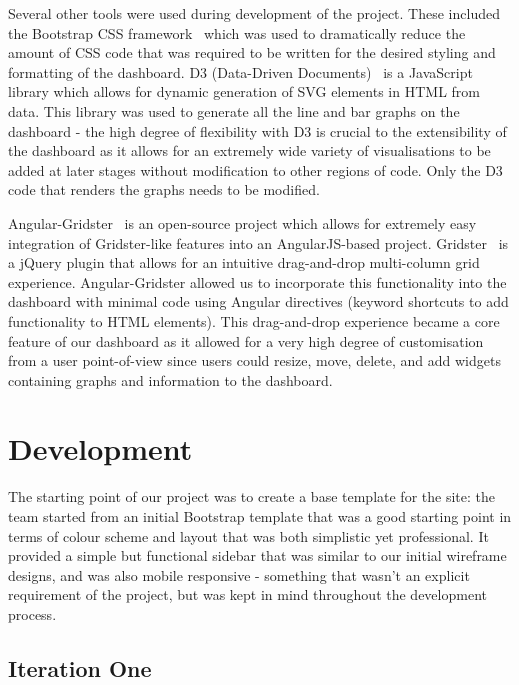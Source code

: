 \documentclass{l3proj}
\begin{document}
Several other tools were used during development of the project. These included the Bootstrap CSS framework~\cite{Bootstrap} which was used to dramatically reduce the amount of CSS code that was required to be written for the desired styling and formatting of the dashboard. D3 (Data-Driven Documents)~\cite{d3Webpage} is a JavaScript library which allows for dynamic generation of SVG elements in HTML from data. This library was used to generate all the line and bar graphs on the dashboard - the high degree of flexibility with D3 is crucial to the extensibility of the dashboard as it allows for an extremely wide variety of visualisations to be added at later stages without modification to other regions of code. Only the D3 code that renders the graphs needs to be modified.

Angular-Gridster~\cite{AngularGridster} is an open-source project which allows for extremely easy integration of Gridster-like features into an AngularJS-based project. Gridster~\cite{Gridster} is a jQuery plugin that allows for an intuitive drag-and-drop multi-column grid experience. Angular-Gridster allowed us to incorporate this functionality into the dashboard with minimal code using Angular directives (keyword shortcuts to add functionality to HTML elements). This drag-and-drop experience became a core feature of our dashboard as it allowed for a very high degree of customisation from a user point-of-view since users could resize, move, delete, and add widgets containing graphs and information to the dashboard.

\section{Development}
\label{sec:development}

The starting point of our project was to create a base template for the site: the team started from an initial Bootstrap template that was a good starting point in terms of colour scheme and layout that was both simplistic yet professional. It provided a simple but functional sidebar that was similar to our initial wireframe designs, and was also mobile responsive - something that wasn't an explicit requirement of the project, but was kept in mind throughout the development process.

\subsection{Iteration One}
\label{sec:development:iteration-one}
\end{document}
